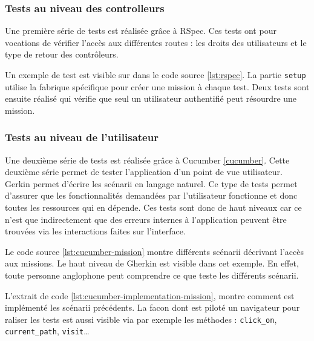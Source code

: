 \subsubsection{Tests au niveau des controlleurs}
Une première série de tests est réalisée grâce à RSpec. Ces tests ont pour vocations de vérifier l'accès aux différentes routes : les droits des utilisateurs et le type de retour des contrôleurs.

Un exemple de test est visible sur dans le code source \ref{lst:rspec}. La partie \texttt{setup} utilise la fabrique spécifique pour créer une mission à chaque test. Deux tests sont ensuite réalisé qui vérifie que seul un utilisateur authentifié peut résourdre une mission.



\subsubsection{Tests au niveau de l'utilisateur}
Une deuxième série de tests est réalisée grâce à Cucumber \ref{cucumber}. Cette deuxième série permet de tester l'application d'un point de vue utilisateur. Gerkin permet d'écrire les scénarii en langage naturel. Ce type de tests permet d'assurer que les fonctionnalités demandées par l'utilisateur fonctionne et donc toutes les ressources qui en dépende. Ces tests sont donc de haut niveaux car ce n'est que indirectement que des erreurs internes à l'application peuvent être trouvées via les interactions faites sur l'interface.




Le code source \ref{lst:cucumber-mission} montre différents scénarii décrivant l'accès aux missions. Le haut niveau de Gherkin est visible dans cet exemple. En effet, toute personne anglophone peut comprendre ce que teste les différents scénarii. 

L'extrait de code \ref{lst:cucumber-implementation-mission}, montre comment est implémenté les scénarii précédents. La facon dont est piloté un navigateur pour raliser les tests est aussi visible via par exemple les méthodes : \texttt{click\_on}, \texttt{current\_path}, \texttt{visit}\ldots

